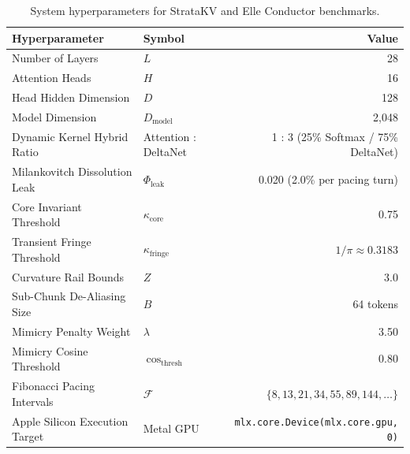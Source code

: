 \documentclass[11pt,letterpaper]{article}
\theoremstyle{definition}
\begin{document}
\begin{table}[h]
\centering
\small
\begin{tabular}{@{}llr@{}}
\toprule
\textbf{Hyperparameter} & \textbf{Symbol} & \textbf{Value} \\ \midrule
Number of Layers & $L$ & 28 \\
Attention Heads & $H$ & 16 \\
Head Hidden Dimension & $D$ & 128 \\
Model Dimension & $D_{\text{model}}$ & 2,048 \\
Dynamic Kernel Hybrid Ratio & Attention : DeltaNet & 1 : 3 (25\% Softmax / 75\% DeltaNet) \\
Milankovitch Dissolution Leak & $\Phi_{\text{leak}}$ & 0.020 (2.0\% per pacing turn) \\
Core Invariant Threshold & $\kappa_{\text{core}}$ & 0.75 \\
Transient Fringe Threshold & $\kappa_{\text{fringe}}$ & $1/\pi \approx 0.3183$ \\
Curvature Rail Bounds & $Z$ & 3.0 \\
Sub-Chunk De-Aliasing Size & $B$ & 64 tokens \\
Mimicry Penalty Weight & $\lambda$ & 3.50 \\
Mimicry Cosine Threshold & $\cos_{\text{thresh}}$ & 0.80 \\
Fibonacci Pacing Intervals & $\mathcal{F}$ & $\{8, 13, 21, 34, 55, 89, 144, \dots\}$ \\
Apple Silicon Execution Target & Metal GPU & \texttt{mlx.core.Device(mlx.core.gpu, 0)} \\ \bottomrule
\end{tabular}
\caption{System hyperparameters for StrataKV and Elle Conductor benchmarks.}
\label{tab:hyperparams}
\end{table}



\end{document}
